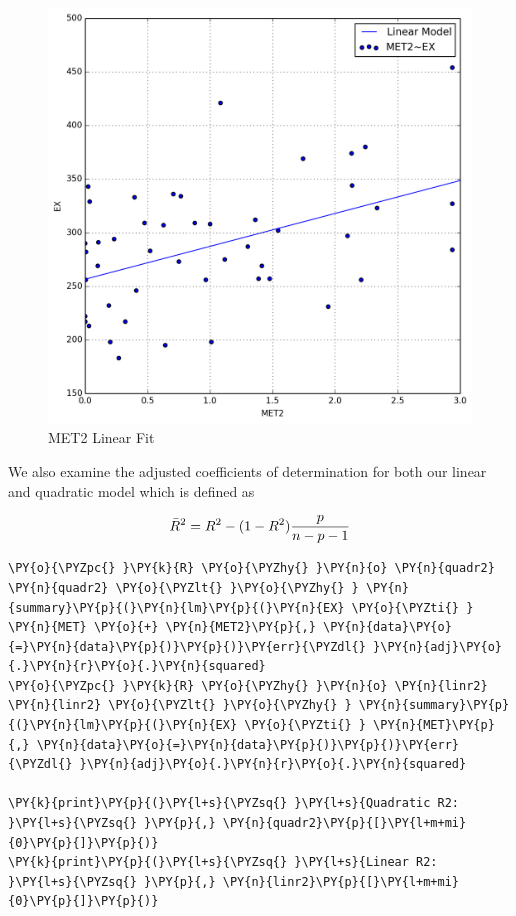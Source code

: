 \documentclass[10pt]{article}\usepackage[]{graphicx}\usepackage[]{xcolor}
\begin{document}
    \begin{figure}[H]
        \centering
        \includegraphics[scale=0.6]{./img/squarefit.png}
        \caption{MET2 Linear Fit}
        \label{fig:met2fit}
    \end{figure}
    
    We also examine the adjusted coefficients of determination for both our
linear and quadratic model which is defined as

\begin{equation}
\bar R^2 = {R^{2}-(1-R^{2}){p \over n-p-1} }
\end{equation}

\begin{Verbatim}[commandchars=\\\{\}]
\PY{o}{\PYZpc{} }\PY{k}{R} \PY{o}{\PYZhy{} }\PY{n}{o} \PY{n}{quadr2} \PY{n}{quadr2} \PY{o}{\PYZlt{} }\PY{o}{\PYZhy{} } \PY{n}{summary}\PY{p}{(}\PY{n}{lm}\PY{p}{(}\PY{n}{EX} \PY{o}{\PYZti{} } \PY{n}{MET} \PY{o}{+} \PY{n}{MET2}\PY{p}{,} \PY{n}{data}\PY{o}{=}\PY{n}{data}\PY{p}{)}\PY{p}{)}\PY{err}{\PYZdl{} }\PY{n}{adj}\PY{o}{.}\PY{n}{r}\PY{o}{.}\PY{n}{squared}
\PY{o}{\PYZpc{} }\PY{k}{R} \PY{o}{\PYZhy{} }\PY{n}{o} \PY{n}{linr2} \PY{n}{linr2} \PY{o}{\PYZlt{} }\PY{o}{\PYZhy{} } \PY{n}{summary}\PY{p}{(}\PY{n}{lm}\PY{p}{(}\PY{n}{EX} \PY{o}{\PYZti{} } \PY{n}{MET}\PY{p}{,} \PY{n}{data}\PY{o}{=}\PY{n}{data}\PY{p}{)}\PY{p}{)}\PY{err}{\PYZdl{} }\PY{n}{adj}\PY{o}{.}\PY{n}{r}\PY{o}{.}\PY{n}{squared}

\PY{k}{print}\PY{p}{(}\PY{l+s}{\PYZsq{} }\PY{l+s}{Quadratic R2:  }\PY{l+s}{\PYZsq{} }\PY{p}{,} \PY{n}{quadr2}\PY{p}{[}\PY{l+m+mi}{0}\PY{p}{]}\PY{p}{)}
\PY{k}{print}\PY{p}{(}\PY{l+s}{\PYZsq{} }\PY{l+s}{Linear R2:    }\PY{l+s}{\PYZsq{} }\PY{p}{,} \PY{n}{linr2}\PY{p}{[}\PY{l+m+mi}{0}\PY{p}{]}\PY{p}{)}
\end{Verbatim}
\end{document}
